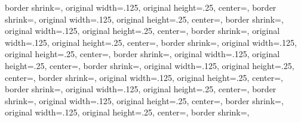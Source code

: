 {{%
	border shrink=\pgfpageoptionborder,%
	original width=.125\pgfpageoptionheight,%
	original height=.25\pgfpageoptionwidth,%
	center=\pgfpoint{.5\pgfphysicalwidth}{.5\pgfphysicalheight},%
}%
{%
	border shrink=\pgfpageoptionborder,%
	original width=.125\pgfpageoptionheight,%
	original height=.25\pgfpageoptionwidth,%
	center=\pgfpoint{.75\pgfphysicalwidth}{.5\pgfphysicalheight},%
}%
%
%
%
{%
	border shrink=\pgfpageoptionborder,%
	original width=.125\pgfpageoptionheight,%
	original height=.25\pgfpageoptionwidth,%
	center=\pgfpoint{0pt}{.375\pgfphysicalheight},%
}%
{%
	border shrink=\pgfpageoptionborder,%
	original width=.125\pgfpageoptionheight,%
	original height=.25\pgfpageoptionwidth,%
	center=\pgfpoint{.25\pgfphysicalwidth}{.375\pgfphysicalheight},%
}%
{%
	border shrink=\pgfpageoptionborder,%
	original width=.125\pgfpageoptionheight,%
	original height=.25\pgfpageoptionwidth,%
	center=\pgfpoint{.5\pgfphysicalwidth}{.375\pgfphysicalheight},%
}%
{%
	border shrink=\pgfpageoptionborder,%
	original width=.125\pgfpageoptionheight,%
	original height=.25\pgfpageoptionwidth,%
	center=\pgfpoint{.75\pgfphysicalwidth}{.375\pgfphysicalheight},%
}%
%
%
%
{%
	border shrink=\pgfpageoptionborder,%
	original width=.125\pgfpageoptionheight,%
	original height=.25\pgfpageoptionwidth,%
	center=\pgfpoint{0pt}{.25\pgfphysicalheight},%
}%
{%
	border shrink=\pgfpageoptionborder,%
	original width=.125\pgfpageoptionheight,%
	original height=.25\pgfpageoptionwidth,%
	center=\pgfpoint{.25\pgfphysicalwidth}{.25\pgfphysicalheight},%
}%
{%
	border shrink=\pgfpageoptionborder,%
	original width=.125\pgfpageoptionheight,%
	original height=.25\pgfpageoptionwidth,%
	center=\pgfpoint{.5\pgfphysicalwidth}{.25\pgfphysicalheight},%
}%
{%
	border shrink=\pgfpageoptionborder,%
	original width=.125\pgfpageoptionheight,%
	original height=.25\pgfpageoptionwidth,%
	center=\pgfpoint{.75\pgfphysicalwidth}{.25\pgfphysicalheight},%
}%
%
%
%
{%
	border shrink=\pgfpageoptionborder,%
	original width=.125\pgfpageoptionheight,%
	original height=.25\pgfpageoptionwidth,%
	center=\pgfpoint{0pt}{.125\pgfphysicalheight},%
}%
{%
	border shrink=\pgfpageoptionborder,%
}}
